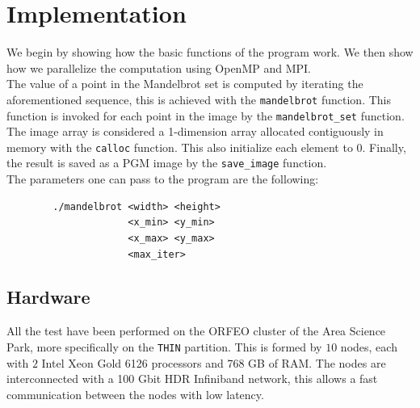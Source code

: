 \section{Implementation}
    We begin by showing how the basic functions of the program work. We then
    show how we parallelize the computation using OpenMP and MPI. \\
    The value of a point in the Mandelbrot set is computed by iterating the
    aforementioned sequence, this is achieved with the \texttt{mandelbrot}
    function. This function is invoked for each point in the image by the
    \texttt{mandelbrot\_set} function. The image array is considered a 1-dimension
    array allocated contiguously in memory with the \texttt{calloc} function.
    This also initialize each element to 0. Finally, the result is saved as
    a PGM image by the \texttt{save\_image} function. \\
    The parameters one can pass to the program are the following:
    \begin{verbatim}
        ./mandelbrot <width> <height> 
                     <x_min> <y_min> 
                     <x_max> <y_max> 
                     <max_iter>
    \end{verbatim}

\subsection{Hardware}
    All the test have been performed on the ORFEO cluster of the Area Science
    Park, more specifically on the \texttt{THIN} partition. This is formed
    by $10$ nodes, each with $2$ Intel Xeon Gold 6126 processors and 768 GB of
    RAM. The nodes are interconnected with a 100 Gbit HDR Infiniband network,
    this allows a fast communication between the nodes with low latency.

